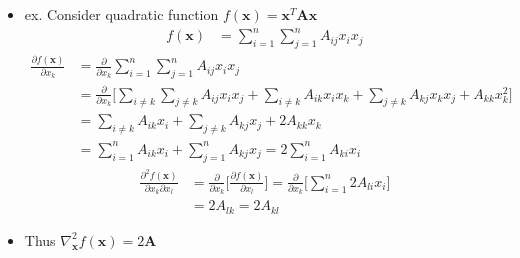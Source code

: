 \documentclass[letterpaper,12pt]{article}
\newcommand{\vect}[1]{\mathbf{#1}}
\newcommand{\matr}[1]{\mathbf{#1}}
\begin{document}
\begin{itemize}
 \item ex. Consider quadratic function $f(\vect{x}) = \vect{x}^T \matr{A} \vect{x}$
       \begin{align}
        f(\vect{x}) & = \sum_{i=1}^{n} \sum_{j=1}^{n} A_{ij} x_i x_j
       \end{align}
       \begin{align}
        \frac{\partial f(\vect{x})}{\partial x_k} & = \frac{\partial}{\partial x_k}\sum_{i=1}^{n}\sum_{j=1}^{n} A_{ij} x_i x_j                                                                                                   \\
                                                  & = \frac{\partial}{\partial x_k} \bigg[ \sum_{i \neq k} \sum_{j \neq k} A_{ij} x_i x_j + \sum_{i \neq k} A_{ik} x_i x_k + \sum_{j \neq k} A_{kj} x_k x_j + A_{kk}x_k^2 \bigg] \\
                                                  & = \sum_{i \neq k} A_{ik} x_i + \sum_{j \neq k} A_{kj} x_j + 2 A_{kk}x_k                                                                                                      \\
                                                  & = \sum_{i=1}^{n} A_{ik} x_i + \sum_{j=1}^{n} A_{kj} x_j = 2\sum_{i=1}^{n} A_{ki} x_i
       \end{align}
       \begin{align}
        \frac{\partial^2 f(\vect{x})}{\partial x_k \partial x_l} & = \frac{\partial}{\partial x_k} \bigg[ \frac{\partial f(\vect{x})}{\partial x_l} \bigg] = \frac{\partial}{\partial x_k} \bigg[ \sum_{i=1}^{n} 2 A_{li} x_i \bigg] \\
                                                                 & = 2A_{lk} = 2A_{kl}
       \end{align}
 \item Thus $\nabla_{\vect{x}}^2 f(\vect{x}) = 2\matr{A}$
\end{itemize}
\end{document}
